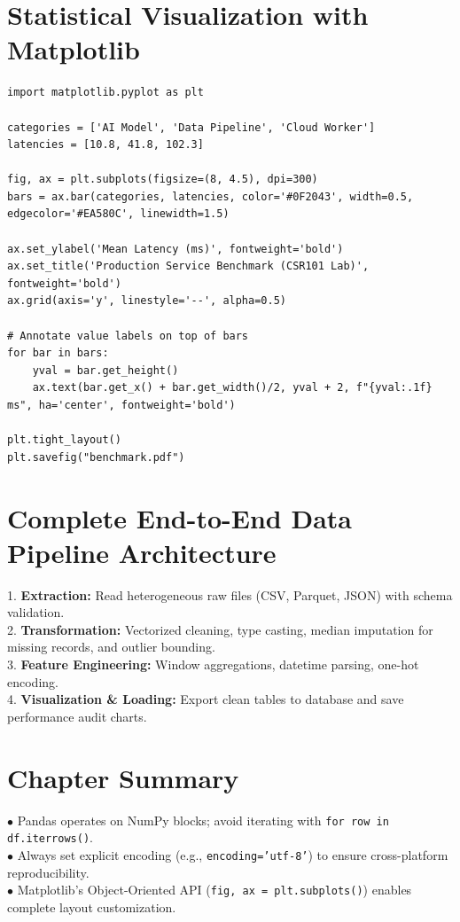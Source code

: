 \section{Statistical Visualization with Matplotlib}
\begin{lstlisting}
import matplotlib.pyplot as plt

categories = ['AI Model', 'Data Pipeline', 'Cloud Worker']
latencies = [10.8, 41.8, 102.3]

fig, ax = plt.subplots(figsize=(8, 4.5), dpi=300)
bars = ax.bar(categories, latencies, color='#0F2043', width=0.5, edgecolor='#EA580C', linewidth=1.5)

ax.set_ylabel('Mean Latency (ms)', fontweight='bold')
ax.set_title('Production Service Benchmark (CSR101 Lab)', fontweight='bold')
ax.grid(axis='y', linestyle='--', alpha=0.5)

# Annotate value labels on top of bars
for bar in bars:
    yval = bar.get_height()
    ax.text(bar.get_x() + bar.get_width()/2, yval + 2, f"{yval:.1f} ms", ha='center', fontweight='bold')

plt.tight_layout()
plt.savefig("benchmark.pdf")
\end{lstlisting}

\section{Complete End-to-End Data Pipeline Architecture}
\begin{methodbox}
1. \textbf{Extraction:} Read heterogeneous raw files (CSV, Parquet, JSON) with schema validation.\\
2. \textbf{Transformation:} Vectorized cleaning, type casting, median imputation for missing records, and outlier bounding.\\
3. \textbf{Feature Engineering:} Window aggregations, datetime parsing, one-hot encoding.\\
4. \textbf{Visualization \& Loading:} Export clean tables to database and save performance audit charts.
\end{methodbox}

\section{Chapter Summary}
\begin{summarybox}
$\bullet$ Pandas operates on NumPy blocks; avoid iterating with \texttt{for row in df.iterrows()}.\\
$\bullet$ Always set explicit encoding (e.g., \texttt{encoding='utf-8'}) to ensure cross-platform reproducibility.\\
$\bullet$ Matplotlib's Object-Oriented API (\texttt{fig, ax = plt.subplots()}) enables complete layout customization.
\end{summarybox}
